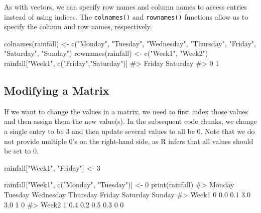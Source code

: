 \documentclass[
  letterpaper,
]{latex/krantz}
\makeatletter
\newenvironment{Shaded}{\begin{snugshade}}{\end{snugshade}}
\newcommand{\CommentTok}[1]{\textcolor[rgb]{0.37,0.37,0.37}{#1}}
\newcommand{\DecValTok}[1]{\textcolor[rgb]{0.68,0.00,0.00}{#1}}
\newcommand{\FunctionTok}[1]{\textcolor[rgb]{0.28,0.35,0.67}{#1}}
\newcommand{\NormalTok}[1]{\textcolor[rgb]{0.00,0.23,0.31}{#1}}
\newcommand{\OtherTok}[1]{\textcolor[rgb]{0.00,0.23,0.31}{#1}}
\newcommand{\StringTok}[1]{\textcolor[rgb]{0.13,0.47,0.30}{#1}}
\newenvironment{kframe}{%
\medskip{}
\setlength{\fboxsep}{.8em}
 \def\at@end@of@kframe{}%
 \ifinner\ifhmode%
  \def\at@end@of@kframe{\end{minipage}}%
  \begin{minipage}{\columnwidth}%
 \fi\fi%
 \def\FrameCommand##1{\hskip\@totalleftmargin \hskip-\fboxsep
 \colorbox{shadecolor}{##1}\hskip-\fboxsep
     \hskip-\linewidth \hskip-\@totalleftmargin \hskip\columnwidth}%
 \MakeFramed {\advance\hsize-\width
   \@totalleftmargin\z@ \linewidth\hsize
   \@setminipage}}%
 {\par\unskip\endMakeFramed%
 \at@end@of@kframe}
\renewenvironment{Shaded}{\begin{kframe}}{\end{kframe}}
\makeatother
\begin{document}
As with vectors, we can specify row names and column names
 to access entries instead of using indices. The
\texttt{colnames()}
and \texttt{rownames()}
 functions allow us to
specify the column and row names, respectively.

\begin{Shaded}
\begin{Highlighting}[]
\FunctionTok{colnames}\NormalTok{(rainfall) }\OtherTok{\textless{}{-}} \FunctionTok{c}\NormalTok{(}\StringTok{"Monday"}\NormalTok{, }\StringTok{"Tuesday"}\NormalTok{, }\StringTok{"Wednesday"}\NormalTok{, }\StringTok{"Thursday"}\NormalTok{, }
                        \StringTok{"Friday"}\NormalTok{, }\StringTok{"Saturday"}\NormalTok{, }\StringTok{"Sunday"}\NormalTok{)}
\FunctionTok{rownames}\NormalTok{(rainfall) }\OtherTok{\textless{}{-}} \FunctionTok{c}\NormalTok{(}\StringTok{"Week1"}\NormalTok{, }\StringTok{"Week2"}\NormalTok{)}
\NormalTok{rainfall[}\StringTok{"Week1"}\NormalTok{, }\FunctionTok{c}\NormalTok{(}\StringTok{"Friday"}\NormalTok{,}\StringTok{"Saturday"}\NormalTok{)]}
\CommentTok{\#\textgreater{}   Friday Saturday }
\CommentTok{\#\textgreater{}        0        1}
\end{Highlighting}
\end{Shaded}

\subsection{\texorpdfstring{Modifying a Matrix
}{Modifying a Matrix }}\label{modifying-a-matrix}

If we want to change the values in a matrix, we need to first index
those values and then assign them the new value(s). In the subsequent
code chunks, we change a single entry to be 3 and then update several
values to all be 0. Note that we do not provide multiple 0's on the
right-hand side, as R infers that all values should be set to 0.

\begin{Shaded}
\begin{Highlighting}[]
\NormalTok{rainfall[}\StringTok{"Week1"}\NormalTok{, }\StringTok{"Friday"}\NormalTok{] }\OtherTok{\textless{}{-}} \DecValTok{3}
\end{Highlighting}
\end{Shaded}

\begin{Shaded}
\begin{Highlighting}[]
\NormalTok{rainfall[}\StringTok{"Week1"}\NormalTok{, }\FunctionTok{c}\NormalTok{(}\StringTok{"Monday"}\NormalTok{, }\StringTok{"Tuesday"}\NormalTok{)] }\OtherTok{\textless{}{-}} \DecValTok{0}
\FunctionTok{print}\NormalTok{(rainfall)}
\CommentTok{\#\textgreater{}       Monday Tuesday Wednesday Thursday Friday Saturday Sunday}
\CommentTok{\#\textgreater{} Week1      0     0.0       0.1      3.0    3.0        1      0}
\CommentTok{\#\textgreater{} Week2      1     0.4       0.2      0.5    0.3        0      0}
\end{Highlighting}
\end{Shaded}
\end{document}
